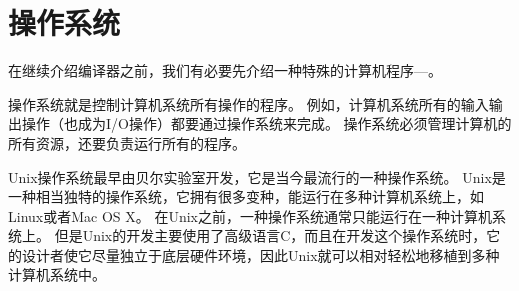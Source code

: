 \section{操作系统}
{
    在继续介绍编译器之前，我们有必要先介绍一种特殊的计算机程序---。

    操作系统就是控制计算机系统所有操作的程序。
    例如，计算机系统所有的输入输出操作（也成为I/O操作）都要通过操作系统来完成。
    操作系统必须管理计算机的所有资源，还要负责运行所有的程序。

    Unix操作系统最早由贝尔实验室开发，它是当今最流行的一种操作系统。
    Unix是一种相当独特的操作系统，它拥有很多变种，能运行在多种计算机系统上，如Linux或者Mac OS X。
    在Unix之前，一种操作系统通常只能运行在一种计算机系统上。
    但是Unix的开发主要使用了高级语言C，而且在开发这个操作系统时，它的设计者使它尽量独立于底层硬件环境，因此Unix就可以相对轻松地移植到多种计算机系统中。
}

\endinput
